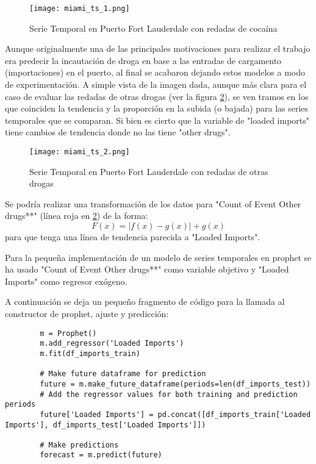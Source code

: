 \documentclass[12pt]{article}
\begin{document}
	\begin{figure}[H]
		\caption{\label{miami_ts_1} Serie Temporal en Puerto Fort Lauderdale con redadas de cocaína}
		\centering
		\hspace*{1cm}
		\texttt{[image: miami\_ts\_1.png]}
	\end{figure}

	Aunque originalmente una de las principales motivaciones para realizar el trabajo era predecir la incautación de droga en base a las entradas de cargamento (importaciones) en el puerto, al final se acabaron dejando estos modelos a modo de experimentación. A simple vista de la imagen dada, aunque más clara para el caso de evaluar las redadas de otras drogas (ver la figura \ref{miami_ts_2}), se ven tramos en los que coinciden la tendencia y la proporción en la subida (o bajada) para las series temporales que se comparan. Si bien es cierto que la variable de "loaded imports" tiene cambios de tendencia donde no las tiene "other drugs".
	
	\begin{figure}[H]
		\caption{\label{miami_ts_2} Serie Temporal en Puerto Fort Lauderdale con redadas de otras drogas}
		\centering
		\hspace*{1cm}
		\texttt{[image: miami\_ts\_2.png]}
	\end{figure}

	Se podría realizar una transformación de los datos para "Count of Event Other drugs**" (línea roja en \ref{miami_ts_2}) de la forma:
	$$F(x) = |f(x) - g(x)| + g(x)$$
	para que tenga una línea de tendencia parecida a "Loaded Imports".
	
	Para la pequeña implementación de un modelo de series temporales en prophet se ha usado "Count of Event Other drugs**" como variable objetivo y "Loaded Imports" como regresor exógeno.
	
	A continuación se deja un pequeño fragmento de código para la llamada al constructor de prophet, ajuste y predicción:
	\begin{verbatim}
		m = Prophet()
		m.add_regressor('Loaded Imports')
		m.fit(df_imports_train)
		
		# Make future dataframe for prediction
		future = m.make_future_dataframe(periods=len(df_imports_test))
		# Add the regressor values for both training and prediction periods
		future['Loaded Imports'] = pd.concat([df_imports_train['Loaded Imports'], df_imports_test['Loaded Imports']])
		
		# Make predictions
		forecast = m.predict(future)
	\end{verbatim}
\end{document}
